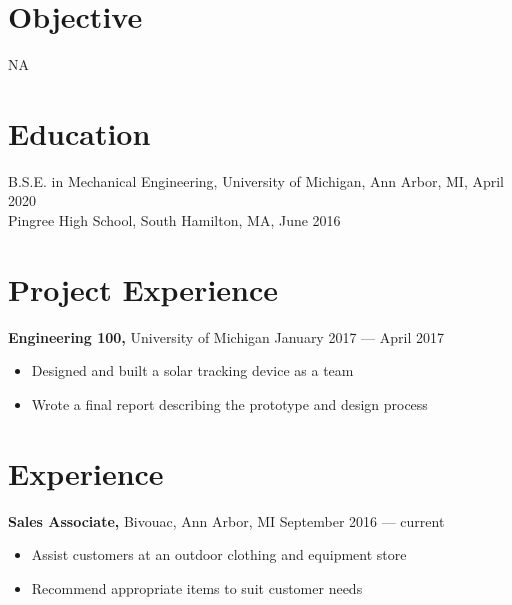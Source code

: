 \documentclass[margin]{res}
\begin{document}

\address{{\bf Present Address} \\ 1021 Vaughn St \\ The Dean Apt 1 \\ Ann Arbor, MI 48104  \\ (978) 873-7207 }
\address{{\bf Permanent Address} \\ 1499 Salem Street \\ North Andover, MA 01845 \\ (978) 725-4887 }


\begin{resume}

	\section{Objective}
	NA

	\section{Education}
	B.S.E. in Mechanical Engineering, University of Michigan, Ann Arbor, MI, April 2020 \\
	Pingree High School, South Hamilton, MA, June 2016

  \section{Project Experience}
  {\bf Engineering 100,} University of Michigan \hfill January 2017 --- April 2017
  \begin{itemize} \itemsep -2pt
    \item Designed and built a solar tracking device as a team
    \item Wrote a final report describing the prototype and design process
  \end{itemize}

	\section{Experience}
	{\bf Sales Associate,} Bivouac, Ann Arbor, MI \hfill September 2016 --- current
	\begin{itemize} \itemsep -2pt
		\item Assist customers at an outdoor clothing and equipment store
		\item Recommend appropriate items to suit customer needs
	\end{itemize}


\end{resume}
\end{document}
